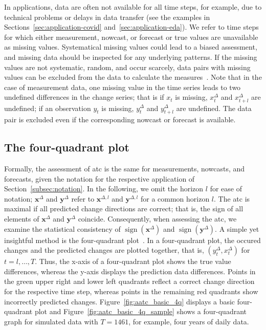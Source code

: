 \documentclass[pdflatex]{sn-jnl}
\theoremstyle{plain}%
\theoremstyle{definition}
\DeclareMathOperator{\sign}{sign}
\newcommand{\diffxl}{\mathbf{x}^{\Delta,l}}
\newcommand{\diffyl}{\mathbf{y}^{\Delta,l}}
\newcommand{\diffx}{\mathbf{x}^{\Delta}}
\newcommand{\diffy}{\mathbf{y}^{\Delta}}
\newcommand{\diffxt}[1][t]{x^{\Delta}_{#1}}
\newcommand{\diffyt}[1][t]{y^{\Delta}_{#1}}
\begin{document}
In applications, data are often not available for all time steps, for example, due to technical problems or delays in data transfer (see the examples in Sections~\ref{sec:application-covid} and~\ref{sec:application-eda}).
We refer to time steps for which either measurement, nowcast, or forecast or true values are unavailable as missing values.
Systematical missing values could lead to a biased assessment, and missing data should be inspected for any underlying patterns.
If the missing values are not systematic, random, and occur scarcely, data pairs with missing values can be excluded from the data to calculate the measures~\parencite[see][Section 1.3]{VanBuuren2018}.
Note that in the case of measurement data, one missing value in the time series leads to two undefined differences in the change series; that is if $x_t$ is missing, $\diffxt$ and $\diffxt[t+l]$ are undefined; if an observation $y_t$ is missing, $\diffyt$ and $\diffyt[t+l]$ are undefined.
The data pair is excluded even if the corresponding nowcast or forecast is available.



\subsection{The four-quadrant plot}\label{subsec:aatc-four-quadrant-plot}

Formally, the assessment of \ac{atc} is the same for measurements, nowcasts, and forecasts, given the notation for the respective application of Section~\ref{subsec:notation}.
In the following, we omit the horizon $l$ for ease of notation; $\diffx$ and $\diffy$ refer to $\diffxl$ and $\diffyl$ for a common horizon $l$.
The \ac{atc} is maximal if all predicted change directions are correct; that is, the sign of all elements of $\diffx$ and $\diffy$ coincide.
Consequently, when assessing the \ac{atc}, we examine the statistical consistency of $\sign(\diffx)$ and $\sign(\diffy)$.
A simple yet insightful method is the four-quadrant plot~\citep[see, e.g., ][]{Perrino1998, Saugel2015}.
In a four-quadrant plot, the occured changes and the predicted changes are plotted together, that is, $(\diffyt, \diffxt)$ for $t = l, \dots, T$.
Thus, the x-axis of a four-quadrant plot shows the true value differences, whereas the y-axis displays the prediction data differences.
Points in the green upper right and lower left quadrants reflect a correct change direction for the respective time step, whereas points in the remaining red quadrants show incorrectly predicted changes.
Figure~\ref{fig:aatc_basic_4q} displays a basic four-quadrant plot and Figure~\ref{fig:aatc_basic_4q_sample} shows a four-quadrant graph for simulated data with $T=1461$, for example, four years of daily data.
\end{document}
